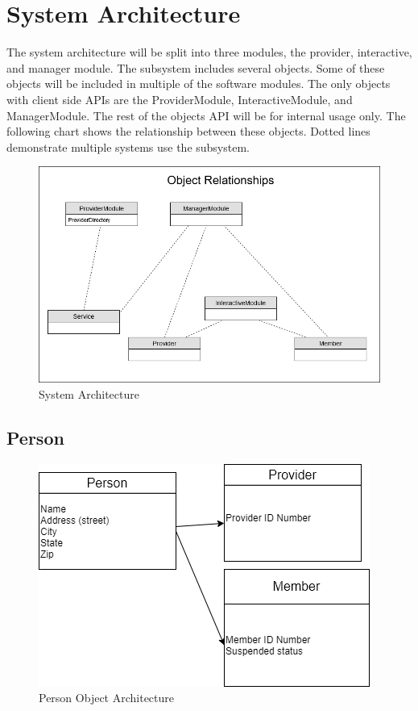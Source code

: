 \documentclass{article}
\begin{document}
\section{System Architecture}
The system architecture will be split into three modules, the provider, interactive, and manager module. The subsystem includes several objects. Some of these objects will be included in multiple of the software modules. The only objects with client side APIs are the ProviderModule, InteractiveModule, and ManagerModule. The rest of the objects API will be for internal usage only. The following chart shows the relationship between these objects. Dotted lines demonstrate multiple systems use the subsystem.

  \begin{figure}[h!]
	\centering
	\includegraphics[width=0.8\linewidth]{architecture.png}
	\caption[System Architecture]{System Architecture}
	\label{fig:P1compileP0-1}
  \end{figure}

\subsection{Person}
  \begin{figure}[h!]
	\centering
	\includegraphics[width=0.8\linewidth]{person.png}
	\caption[Person Object Architecture]{Person Object Architecture}
	\label{fig:P1compileP0-1}
  \end{figure}
\end{document}
